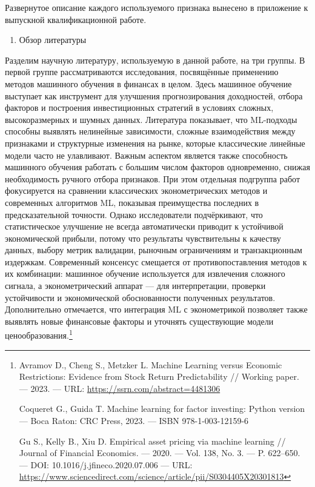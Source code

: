 \documentclass[
]{article}
\begin{document}
Развернутое описание каждого используемого признака вынесено в приложение к выпускной квалификационной работе.

\begin{enumerate}
\def\labelenumi{\arabic{enumi}.}
\item
  Обзор литературы
\end{enumerate}

Разделим научную литературу, используемую в данной работе, на три группы. В первой группе рассматриваются исследования, посвящённые применению методов машинного обучения в финансах в целом. Здесь машинное обучение выступает как инструмент для улучшения прогнозирования доходностей, отбора факторов и построения инвестиционных стратегий в условиях сложных, высокоразмерных и шумных данных. Литература показывает, что ML-подходы способны выявлять нелинейные зависимости, сложные взаимодействия между признаками и структурные изменения на рынке, которые классические линейные модели часто не улавливают. Важным аспектом является также способность машинного обучения работать с большим числом факторов одновременно, снижая необходимость ручного отбора признаков. При этом отдельная подгруппа работ фокусируется на сравнении классических эконометрических методов и современных алгоритмов ML, показывая преимущества последних в предсказательной точности. Однако исследователи подчёркивают, что статистическое улучшение не всегда автоматически приводит к устойчивой экономической прибыли, потому что результаты чувствительны к качеству данных, выбору метрик валидации, рыночным ограничениям и транзакционным издержкам. Современный консенсус смещается от противопоставления методов к их комбинации: машинное обучение используется для извлечения сложного сигнала, а эконометрический аппарат --- для интерпретации, проверки устойчивости и экономической обоснованности полученных результатов. Дополнительно отмечается, что интеграция ML с эконометрикой позволяет также выявлять новые финансовые факторы и уточнять существующие модели ценообразования.\footnote{Avramov D., Cheng S., Metzker L. Machine Learning versus Economic Restrictions: Evidence from Stock Return Predictability // Working paper. --- 2023. --- URL: \url{https://ssrn.com/abstract=4481306}

  Coqueret G., Guida T. Machine learning for factor investing: Python version --- Boca Raton: CRC Press, 2023. --- ISBN 978-1-003-12159-6

  Gu S., Kelly B., Xiu D. Empirical asset pricing via machine learning // Journal of Financial Economics. --- 2020. --- Vol. 138, No. 3. --- P. 622--650. --- DOI: 10.1016/j.jfineco.2020.07.006 --- URL: \url{https://www.sciencedirect.com/science/article/pii/S0304405X20301813}

}
\end{document}
